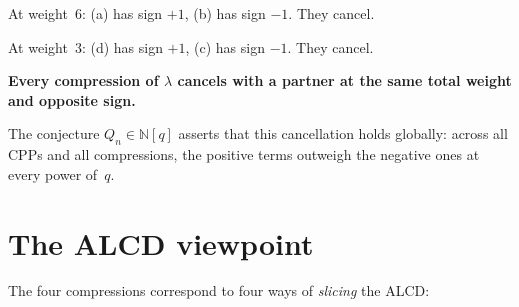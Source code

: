 \documentclass[11pt]{article}
\begin{document}
\medskip\noindent
At weight~6: (a) has sign $+1$, (b) has sign $-1$.
They cancel.

\noindent
At weight~3: (d) has sign $+1$, (c) has sign $-1$.
They cancel.

\medskip\noindent
\textbf{Every compression of $\lambda$ cancels with a
partner at the same total weight and opposite sign.}

\medskip\noindent
The conjecture $Q_n \in \mathbb{N}[q]$ asserts that this
cancellation holds globally: across all CPPs and all
compressions, the positive terms outweigh the negative
ones at every power of~$q$.


\section{The ALCD viewpoint}

The four compressions correspond to four ways of
\emph{slicing} the ALCD:
\end{document}
